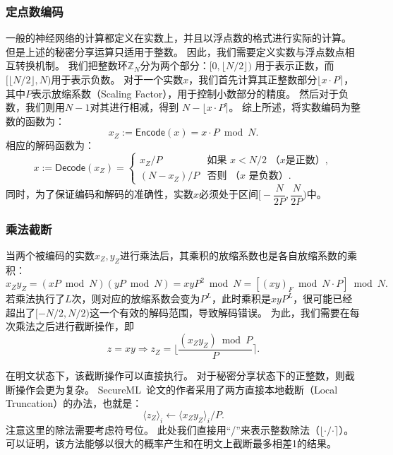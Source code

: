 \subsubsection{定点数编码}
一般的神经网络的计算都定义在实数上，并且以浮点数的格式进行实际的计算。
%
但是上述的秘密分享运算只适用于整数。
%
因此，我们需要定义实数与浮点数点相互转换机制。
%
我们把整数环$\mathbb Z_N$分为两个部分：$[0, \lfloor N/2 \rfloor)$ 用于表示正数，而$[\lfloor N/2 \rfloor, N)$用于表示负数。
%
对于一个实数$x$，我们首先计算其正整数部分$\lfloor x\cdot P \rceil$，其中$P$表示放缩系数（Scaling Factor），用于控制小数部分的精度。
%
然后对于负数，我们则用$N - 1$对其进行相减，得到 $N - \lfloor x\cdot P \rceil$。
%
综上所述，将实数编码为整数的函数为：
\begin{equation}
    x_Z := \mathsf{Encode}(x) = x \cdot P \bmod N.
\end{equation}
%
相应的解码函数为：
\begin{equation}
    x := \mathsf{Decode}(x_Z) = \begin{cases}
        x_Z / P         & \text{如果 $x < N/2$ （$x$是正数）}, \\
        (N - x_Z) / P     & \text{否则 （$x$ 是负数）}.
    \end{cases}
\end{equation}
%
同时，为了保证编码和解码的准确性，实数$x$必须处于区间$\big[ -\dfrac{N}{2P}, \dfrac{N}{2P} \big)$中。


\subsubsection{乘法截断}
当两个被编码的实数$x_Z, y_Z$进行乘法后，其乘积的放缩系数也是各自放缩系数的乘积：
\begin{equation}
    x_Zy_Z = (xP \bmod N)(yP \bmod N) = xyP^2 \bmod N = [(xy)_F \bmod N \cdot P] \bmod N.
\end{equation}
%
若乘法执行了$L$次，则对应的放缩系数会变为$P^L$，此时乘积是$xyP^L$，很可能已经超出了$[-N/2, N/2)$这一个有效的解码范围，导致解码错误。
%
为此，我们需要在每次乘法之后进行截断操作，即
\begin{equation}
    z = xy \Rightarrow z_Z = \Big\lfloor \dfrac{(x_Z y_Z) \bmod P}{P} \Big\rceil.
\end{equation}
%

在明文状态下，该截断操作可以直接执行。
%
对于秘密分享状态下的正整数，则截断操作会更为复杂。
%
SecureML~\cite{mohassel2017secureml}论文的作者采用了两方直接本地截断（Local Truncation）的办法，也就是：
\begin{equation}
    \langle z_Z \rangle_i \gets \langle x_Zy_Z \rangle_i / P.
\end{equation}
%
注意这里的除法需要考虑符号位。
此处我们直接用“/”来表示整数除法（$\lfloor \cdot / \cdot \rceil$）。
%
可以证明，该方法能够以很大的概率产生和在明文上截断最多相差1的结果。

